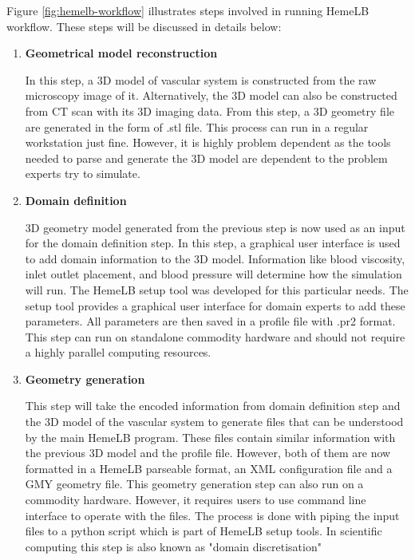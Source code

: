 \vspace{1cm}


Figure \ref{fig:hemelb-workflow} illustrates steps involved in running HemeLB workflow. These steps will be discussed in details below:

\begin{enumerate}

\item{\textbf{Geometrical model reconstruction}}

In this step, a 3D model of vascular system is constructed from the raw microscopy image of it. Alternatively, the 3D model can also be constructed from CT scan with its 3D imaging data. From this step, a 3D geometry file are generated in the form of .stl file. This process can run in a regular workstation just fine. However, it is highly problem dependent as the tools needed to parse and generate the 3D model are dependent to the problem experts try to simulate.

\item{\textbf{Domain definition}}

3D geometry model generated from the previous step is now used as an input for the domain definition step. In this step, a graphical user interface is used to add domain information to the 3D model. Information like blood viscosity, inlet outlet placement, and blood pressure will determine how the simulation will run. The HemeLB setup tool was developed for this particular needs. The setup tool provides a graphical user interface for domain experts to add these parameters. All parameters are then saved in a profile file with .pr2 format. This step can run on standalone commodity hardware and should not require a highly parallel computing resources.

\item{\textbf{Geometry generation}}

This step will take the encoded information from domain definition step and the 3D model of the vascular system to generate files that can be understood by the main HemeLB program. These files contain similar information with the previous 3D model and the profile file. However, both of them are now formatted in a HemeLB parseable format, an XML configuration file and a GMY geometry file. This geometry generation step can also run on a commodity hardware. However, it requires users to use command line interface to operate with the files. The process is done with piping the input files to a python script which is part of HemeLB setup tools. In scientific computing this step is also known as "domain discretisation"


\end{enumerate}
